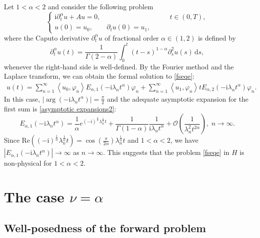 \documentclass[reqno]{amsart}
\numberwithin{equation}{section}
\def \d {\mathrm{d}}
\begin{document}
Let $1<\alpha<2$ and consider the following problem
\begin{equation}\label{fseqe}
\begin{cases}
\mathrm{i}\partial_t^\alpha u +Au=0, &\qquad t \in (0,T),\\
u(0)=u_0, \qquad\partial_tu(0)=u_1,
\end{cases}
\end{equation}
where the Caputo derivative $\partial_t^\alpha u$ of fractional order $\alpha\in (1,2)$ is defined by
\begin{equation}\label{cap12}
\partial_t^\alpha u(t)=\frac{1}{\Gamma(2-\alpha)} \int_0^t(t-s)^{1-\alpha} \partial_s^2 u(s)\, \d s,
\end{equation}
whenever the right-hand side is well-defined. By the Fourier method and the Laplace transform, we can obtain the formal solution to \eqref{fseqe}:
	\begin{align}\label{solution formulae}
        u(t)=\sum_{n=1}^{\infty}\left\langle u_0, \varphi_n\right\rangle E_{\alpha, 1}\left(-\mathrm{i}\lambda_n t^\alpha\right) \varphi_n + \sum_{n=1}^{\infty}\left\langle u_1, \varphi_n\right\rangle tE_{\alpha, 2}\left(-\mathrm{i}\lambda_n t^\alpha\right) \varphi_n.
	\end{align}
In this case, $|\arg(-\mathrm{i}\lambda_n t^\alpha)|=\frac{\pi}{2}$ and the adequate asymptotic expansion for the first sum is \eqref{asymptotic expansions2}:
$$E_{\alpha, 1}\left(-\mathrm{i}\lambda_n t^\alpha\right) =\frac{1}{\alpha} e^{(-\mathrm{i})^{\frac{1}{\alpha}} \lambda_n^{\frac{1}{\alpha}} t}+\frac{1}{\Gamma(1-\alpha)}\frac{1}{\mathrm{i}\lambda_n t^\alpha} + \mathcal{O}\left(\frac{1}{\lambda_n^{2} t^{2\alpha}}\right), \; n\to \infty.$$
Since $\mathrm{Re}\left((-\mathrm{i})^{\frac{1}{\alpha}} \lambda_n^{\frac{1}{\alpha}} t\right)=\cos(\frac{\pi}{2\alpha})\lambda_n^{\frac{1}{\alpha}} t$ and $1<\alpha<2$, we have $|E_{\alpha, 1}\left(-\mathrm{i}\lambda_n t^\alpha\right)| \to \infty$ as $n\to \infty$. This suggests that the problem \eqref{fseqe} in $H$ is non-physical for $1 < \alpha < 2$.

\section{The case $\nu=\alpha$}\label{sec4}
\subsection{Well-posedness of the forward problem}
\end{document}
